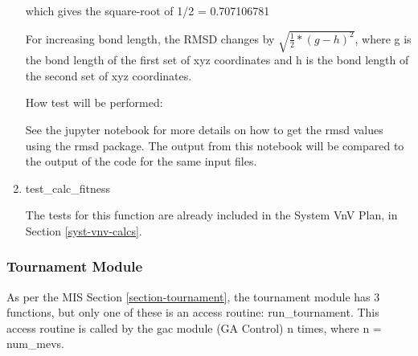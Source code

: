 \documentclass[12pt, titlepage]{article}
\begin{document}
\begin{enumerate}
which gives the square-root of 1/2 = 0.707106781

For increasing bond length, the RMSD changes by $\sqrt{\frac{1}{2}*(g-h)^2}$, 
where g is the bond length of the first set of xyz coordinates and h is the 
bond length of the second set of xyz coordinates.

How test will be performed: 

See the jupyter notebook for more details on how to get the rmsd values using 
the rmsd package. The output from this notebook will be compared to the output 
of the code for the same input files.

\item{test\_calc\_fitness\\}

The tests for this function are already included in the System VnV Plan, in 
Section \ref{syst-vnv-calcs}. 
	
\end{enumerate}

\subsubsection{Tournament Module}\label{test-tournament}

As per the MIS Section \ref{section-tournament}, the tournament module has 3 
functions, but only one of these is an access routine: run\_tournament. This 
access routine is called by the gac module (GA Control) n times, where n = 
num\_mevs. 

\end{document}
